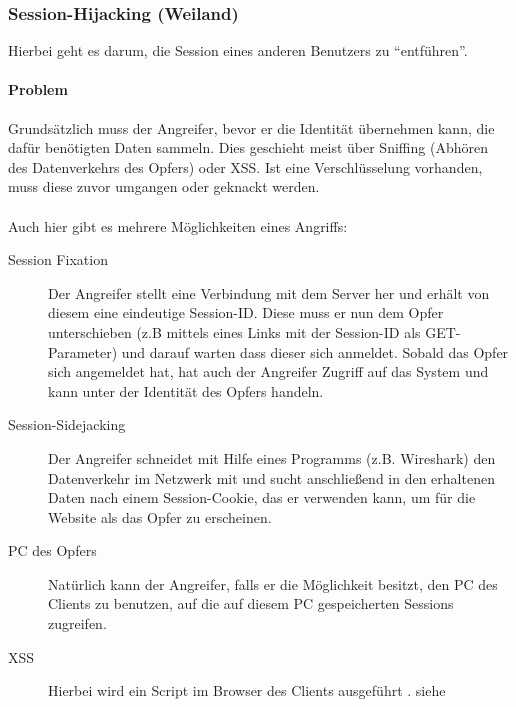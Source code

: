 \subsubsection{Session-Hijacking (Weiland)}
\label{sec:content_security_session-hijacking}
Hierbei geht es darum, die Session eines anderen Benutzers zu \enquote{entführen}. 
\paragraph{Problem}
Grundsätzlich muss der Angreifer, bevor er die Identität übernehmen kann, die dafür benötigten Daten sammeln. Dies geschieht meist über Sniffing (Abhören des Datenverkehrs des Opfers) oder XSS. Ist eine Verschlüsselung vorhanden, muss diese zuvor umgangen oder geknackt werden.\\\\
Auch hier gibt es mehrere Möglichkeiten eines Angriffs:
\begin{description}
\item[Session Fixation] Der Angreifer stellt eine Verbindung mit dem Server her und erhält von diesem eine eindeutige Session-ID. Diese muss er nun dem Opfer unterschieben (z.B mittels eines Links mit der Session-ID als GET-Parameter) und darauf warten dass dieser sich anmeldet. Sobald das Opfer sich angemeldet hat, hat auch der Angreifer Zugriff auf das System und kann unter der Identität des Opfers handeln.
\item[Session-Sidejacking] Der Angreifer schneidet mit Hilfe eines Programms (z.B. Wireshark) den Datenverkehr im Netzwerk mit und sucht anschließend in den erhaltenen Daten nach einem Session-Cookie, das er verwenden kann, um für die Website als das Opfer zu erscheinen.
\item[PC des Opfers] Natürlich kann der Angreifer, falls er die Möglichkeit besitzt, den PC des Clients zu benutzen, auf die auf diesem PC gespeicherten Sessions zugreifen.
\item[XSS] Hierbei wird ein Script im Browser des Clients ausgeführt . siehe 
\end{description}


